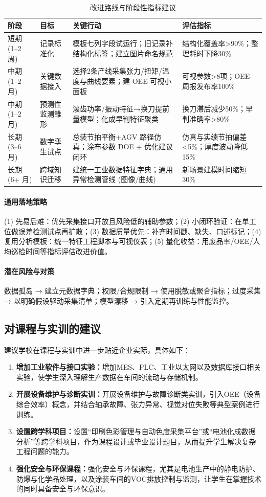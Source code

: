 \begin{table}[htbp]
\centering\small
\begin{tabular}{p{2.4cm}p{2.7cm}p{5.5cm}p{3.5cm}}
\toprule
阶段 & 目标 & 关键行动 & 评估指标 \\
\midrule
短期 (1--2 周) & 记录标准化 & 模板七列字段试运行；旧记录补结构化标签；建立图片命名规范 & 结构化覆盖率>90\%；整理耗时下降30\% \\
中期 (1--2 月) & 关键数据接入 & 选择2条产线采集张力/扭矩/温度与曲线要素；建 OEE 可视小面板 & 可视参数>8项；OEE 周报发布率100\% \\
中期 (1--2 月) & 预测性监测雏形 & 滚齿功率/振动特征→换刀提前量模型；化成早判特征聚类 & 换刀滞后减少50\%；早判准确率>80\% \\
长期 (3--6 月) & 数字孪生试点 & 总装节拍平衡+AGV 路径仿真；涂布参数 DOE + 优化建议闭环 & 仿真与实绩节拍偏差<5\%；厚度波动降低15\% \\
长期 (6+ 月) & 跨域知识迁移 & 建统一工业数据特征字典；通用异常检测管线 (图像/曲线) & 新场景建模时间缩短30\% \\
\bottomrule
\end{tabular}
\caption{改进路线与阶段性指标建议}
\label{tab:improve-roadmap}
\end{table}

\paragraph{通用落地策略} (1) 先易后难：优先采集接口开放且风险低的辅助参数；(2) 小闭环验证：在单工位做误差检测试点再扩散；(3) 数据质量优先：补齐时间戳、缺失、口述标记；(4) 复用分析模板：统一特征工程脚本与可视仪表；(5) 量化收益：用废品率/OEE/人均巡检时间等指标评估改进价值。

\paragraph{潜在风险与对策} 数据孤岛 → 建立元数据字典；权限/合规限制 → 使用脱敏或聚合指标；过度采集 → 以明确假设驱动采集清单；模型漂移 → 引入定期再训练与性能监控。

\subsection{对课程与实训的建议}
建议学校在课程与实训中进一步贴近企业实际，具体如下：
\begin{enumerate}[label=\arabic*.]
    \item \textbf{增加工业软件与接口实验：}增加MES、PLC、工业以太网以及数据库接口相关实验，使学生深入理解生产数据在车间的流动与存储机制。
    \item \textbf{开展设备维护与诊断实训：}开展设备维护与故障诊断类实训，引入OEE（设备综合效率）概念，并结合轴承故障、张力异常、视觉对位失败等典型案例进行训练。
    \item \textbf{设置跨学科项目：}设置“印刷色彩管理与自动色度采集平台”或“电池化成数据分析”等跨学科项目，作为课程设计或毕业设计题目，从而提升学生解决复杂工程问题的能力。
    \item \textbf{强化安全与环保课程：}强化安全与环保课程，尤其是电池生产中的静电防护、防爆与化学品处理，以及涂装车间的VOC排放控制与监测，让学生在掌握技术的同时具备安全与环保意识。
\end{enumerate}

